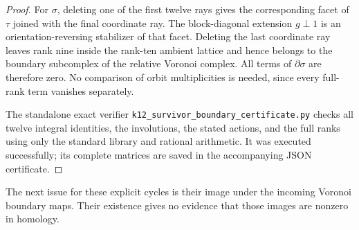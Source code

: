 \begin{proof}
For $\sigma$, deleting one of the first twelve rays gives the
corresponding facet of $\tau$ joined with the final coordinate ray.
The block-diagonal extension $g\perp1$ is an orientation-reversing
stabilizer of that facet. Deleting the last coordinate ray leaves
rank nine inside the rank-ten ambient lattice and hence belongs to
the boundary subcomplex of the relative Voronoi complex. All terms
of $\partial\sigma$ are therefore zero. No comparison of orbit
multiplicities is needed, since every full-rank term vanishes
separately.

The standalone exact verifier
\texttt{k12\_survivor\_boundary\_certificate.py} checks all twelve
integral identities, the involutions, the stated actions, and the
full ranks using only the standard library and rational arithmetic.
It was executed successfully; its complete matrices are saved in
the accompanying JSON certificate.
\end{proof}

The next issue for these explicit cycles is their image under the
incoming Voronoi boundary maps. Their existence gives no evidence
that those images are nonzero in homology.
